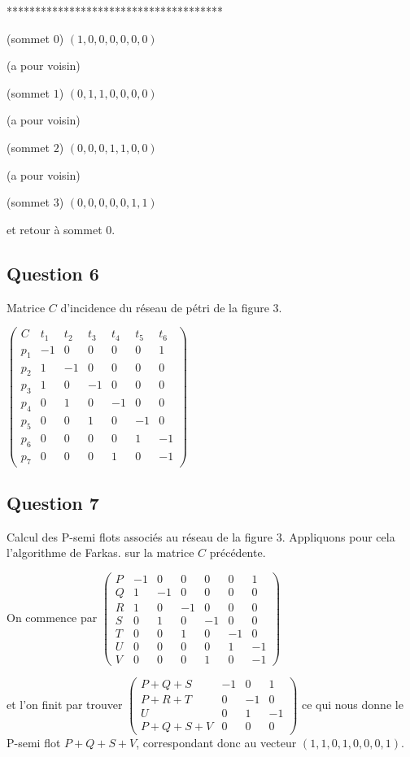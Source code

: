 **************************************

(sommet $0$) $(1, 0, 0, 0, 0, 0, 0)$

(a pour voisin)

(sommet $1$) $(0, 1, 1, 0, 0, 0, 0)$

(a pour voisin)

(sommet $2$) $(0, 0, 0, 1, 1, 0, 0)$

(a pour voisin)

(sommet $3$) $(0, 0, 0, 0, 0, 1, 1)$

et retour à sommet $0$.

\subsection*{Question 6}
Matrice $C$ d'incidence du réseau de pétri de la figure $3$.

 $ \begin{pmatrix}
C&t_1&t_2&t_3&t_4&t_5&t_6 \\
p_1& -1&0&0&0&0&1 \\
p_2&1&-1&0&0&0&0 \\
p_3&1&0&-1&0&0&0 \\
p_4&0&1&0&-1&0&0 \\
p_5&0&0&1&0&-1&0 \\
p_6&0&0&0&0&1&-1 \\
p_7&0&0&0&1&0&-1 
\end{pmatrix}$

\subsection*{Question 7}
Calcul des P-semi flots associés au réseau de la figure
$3$. Appliquons pour cela l'algorithme de Farkas. sur la matrice $C$
précédente.

On commence par  
$ \begin{pmatrix}
P& -1&0&0&0&0&1 \\
Q&1&-1&0&0&0&0 \\
R&1&0&-1&0&0&0 \\
S&0&1&0&-1&0&0 \\
T&0&0&1&0&-1&0 \\
U&0&0&0&0&1&-1 \\
V&0&0&0&1&0&-1 
\end{pmatrix}$

et l'on finit par trouver 
$ \begin{pmatrix}
P+Q+S& -1&0&1 \\
P+R+T&0&-1&0 \\
U&0&1&-1 \\
P+Q+S+V&0&0&0
\end{pmatrix}$
ce qui nous donne le P-semi flot $P+Q+S+V$, correspondant donc au
vecteur $(1, 1, 0, 1, 0, 0, 0, 1)$.

